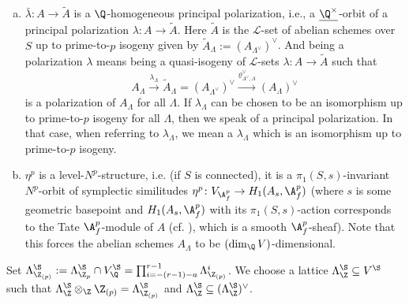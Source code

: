 \documentclass[a4paper]{scrartcl} %
\numberwithin{equation}{section}
\begin{document}
\begin{Remark}
\begin{enumerate}[(a)]
\begin{itemize}
    \end{itemize}
  \item $\bar\lambda\colon A\to\tilde{A}$ is a $\Q$-homogeneous principal polarization, i.e., a $\underline{\Q^\times}$-orbit of a principal polarization $\lambda\colon A\to \tilde{A}$. Here $\tilde{A}$ is the $\mathcal{L}$-set of abelian schemes over $S$ up to prime-to-$p$ isogeny given by $\tilde{A}_\Lambda:=(A_{\Lambda^\vee})^\vee$. And being a polarization $\lambda$ means being a quasi-isogeny of $\mathcal{L}$-sets $\lambda\colon A\to\tilde{A}$ such that
    \begin{equation*}
      A_\Lambda \xrightarrow{\lambda_\Lambda}\tilde{A}_\Lambda=(A_{\Lambda^\vee})^\vee\xrightarrow{\varrho_{\Lambda^\vee,\Lambda}^\vee}(A_\Lambda)^\vee
    \end{equation*}
    is a polarization of $A_\Lambda$ for all $\Lambda$. If $\lambda_\Lambda$ can be chosen to be an isomorphism up to prime-to-$p$ isogeny for all $\Lambda$, then we speak of a principal polarization. In that case, when referring to $\lambda_\Lambda$, we mean a $\lambda_\Lambda$ which is an isomorphism up to prime-to-$p$ isogeny.
  \item $\eta^p$ is a level-$N^p$-structure, i.e. (if $S$ is connected), it is a $\pi_1(S,s)$-invariant $N^p$-orbit of symplectic similitudes $\eta^p\colon V_{\A_f^p}\to H_1(A_s,\A_f^p)$ (where $s$ is some geometric basepoint and $H_1(A_s,\A_f^p)$ with its $\pi_1(S,s)$-action corresponds to the Tate $\A_f^p$-module of $A$ (cf. \cite[]{rz}), which is a smooth $\A_f^p$-sheaf). Note that this forces the abelian schemes $A_\Lambda$ to be $(\dim_\Q V)$-dimensional.
  \end{enumerate}
\end{Remark}

\begin{Definition}
  Set $\Lambda^\S_{\Z_{(p)}}:=\Lambda^\S_{\Z_p}\cap V^\S_\Q=\prod_{i=-(r-1)-a}^{r-1}\Lambda_{\Z_{(p)}}^i$. We choose a lattice $\Lambda^\S_\Z\subseteq V^\S$ such that $\Lambda^\S_\Z\otimes_\Z\Z_{(p)}=\Lambda^\S_{\Z_{(p)}}$ and $\Lambda^\S_\Z\subseteq (\Lambda^\S_\Z)^\vee$.
\end{Definition}
\end{document}
